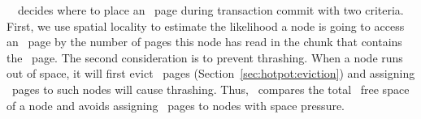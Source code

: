 \hotpot\ \on\ decides where to place an \redundant\ page during transaction commit with two criteria. 
First, we use spatial locality to estimate the likelihood a node is going to access an \redundant\ page 
by the number of pages this node has read in the chunk that contains the \redundant\ page.
The second consideration is to prevent thrashing.
When a node runs out of space, it will first evict \redundant\ pages (Section~\ref{sec:hotpot:eviction})
and assigning \redundant\ pages to such nodes will cause thrashing.
Thus, \hotpot\ compares the total \nvm\ free space of a node and avoids assigning 
\redundant\ pages to nodes with space pressure.
\fi
